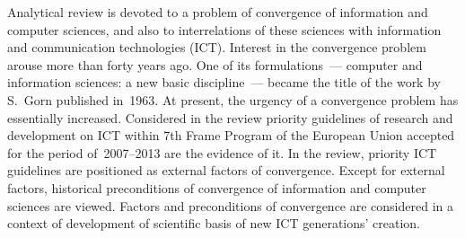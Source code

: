 \noindent Analytical review is devoted to a problem of convergence of 
information and computer sciences, and also to interrelations of these sciences 
with information and communication technologies (ICT). Interest in the 
convergence problem arouse more than forty years ago. One of its 
formulations~--- computer and information sciences: a new basic discipline~--- 
became the title of the work by S.~Gorn published in~1963. At present, the 
urgency of a convergence problem has essentially increased. Considered in the 
review priority guidelines of research and development on ICT within 7th Frame 
Program of the European Union accepted for the period of~2007--2013 are the 
evidence of it. In the review, priority ICT guidelines are positioned as 
external factors of convergence. Except for external factors, historical 
preconditions of convergence of information and computer sciences are viewed. 
Factors and preconditions of convergence are considered in a context of 
development of scientific basis of new ICT generations' creation.



 \label{end\stat}
